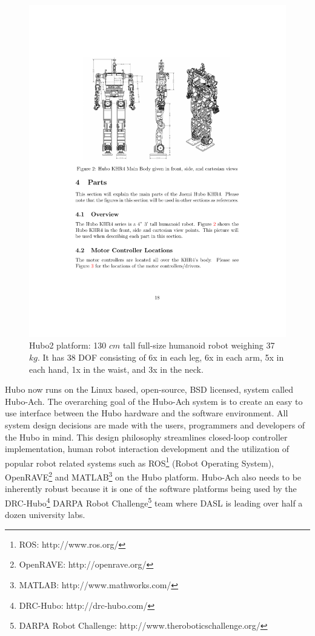 \begin{figure}[thpb]
  \centering
\includegraphics[width=1.0\columnwidth]{./pix/huboSkel.pdf}
  \caption{Hubo2 platform: 130 $cm$ tall full-size humanoid robot weighing 37 $kg$.  It has 38 DOF consisting of 6x in each leg, 6x in each arm, 5x in each hand, 1x in the waist, and 3x in the neck.}
  \label{fig:hubo}
\end{figure}

Hubo now runs on the Linux based, open-source, BSD licensed, system called Hubo-Ach.  
The overarching goal of the Hubo-Ach system is to create an easy to use interface between the Hubo hardware and the software environment.  
All system design decisions are made with the users, programmers and developers of the Hubo in mind.
This design philosophy streamlines closed-loop controller implementation, human robot interaction development and the utilization of popular robot related systems such as ROS\footnote{ROS: http://www.ros.org/} (Robot Operating System), OpenRAVE\footnote{OpenRAVE: http://openrave.org/} and MATLAB\footnote{MATLAB: http://www.mathworks.com/} on the Hubo platform.
Hubo-Ach also needs to be inherently robust because it is one of the software platforms being used by the DRC-Hubo\footnote{DRC-Hubo: http://drc-hubo.com/} DARPA Robot Challenge\footnote{DARPA Robot Challenge: http://www.theroboticschallenge.org/} team where DASL is leading over half a dozen university labs.

